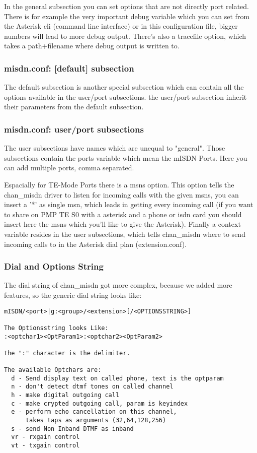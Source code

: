 In the general subsection you can set options that are not directly port
related. There is for example the very important debug variable which you can
set from the Asterisk cli (command line interface) or in this configuration
file, bigger numbers will lead to more debug output. There's also a tracefile
option, which takes a path+filename where debug output is written to.

\subsubsection{misdn.conf: [default] subsection}

The default subsection is another special subsection which can contain all the
options available in the user/port subsections. the user/port subsection inherit
their parameters from the default subsection.

\subsubsection{misdn.conf: user/port subsections}

The user subsections have names which are unequal to "general". Those subsections
contain the ports variable which mean the mISDN Ports. Here you can add
multiple ports, comma separated.

Espacially for TE-Mode Ports there is a msns option. This option tells the
chan\_misdn driver to listen for incoming calls with the given msns, you can
insert a '*' as single msn, which leads in getting every incoming call (if you
want to share on PMP TE S0 with a asterisk and a phone or isdn card you should
insert here the msns which you'll like to give the Asterisk).  Finally a
context variable resides in the user subsections, which tells chan\_misdn where to
send incoming calls to in the Asterisk dial plan (extension.conf).


\subsubsection{Dial and Options String}

The dial string of chan\_misdn got more complex, because we added more features,
so the generic dial string looks like:

\begin{verbatim}
mISDN/<port>|g:<group>/<extension>[/<OPTIONSSTRING>]

The Optionsstring looks Like:
:<optchar1><OptParam1>:<optchar2><OptParam2>

the ":" character is the delimiter.

The available Optchars are: 
  d - Send display text on called phone, text is the optparam
  n - don't detect dtmf tones on called channel
  h - make digital outgoing call
  c - make crypted outgoing call, param is keyindex
  e - perform echo cancellation on this channel, 
      takes taps as arguments (32,64,128,256)
  s - send Non Inband DTMF as inband
  vr - rxgain control
  vt - txgain control
\end{verbatim}

